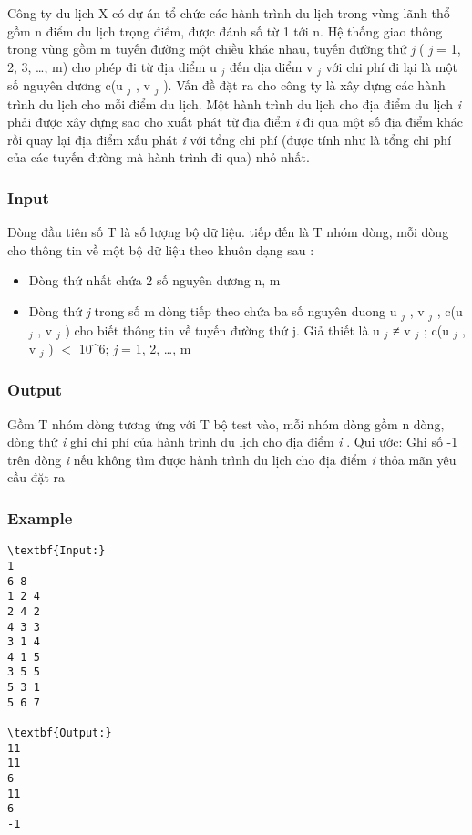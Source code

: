 

Công ty du lịch X có dự án tổ chức các hành trình du lịch trong vùng lãnh thổ gồm n điểm du lịch trọng điểm, được đánh số từ 1 tới n. Hệ thống giao thông trong vùng gồm m tuyến đường một chiều khác nhau, tuyến đường thứ \emph{ j } ( \emph{ j } = 1, 2, 3, …, m) cho phép đi từ địa diểm u $_ j $ đến dịa diểm v $_ j $ với chi phí đi lại là một số nguyên dương c(u $_ j $ , v $_ j $ ). Vấn đề đặt ra cho công ty là xây dựng các hành trình du lịch cho mỗi điểm du lịch. Một hành trình du lịch cho địa điểm du lịch \emph{ i } phải được xây dựng sao cho xuất phát từ địa điểm \emph{ i } đi qua một số địa điểm khác rồi quay lại địa điểm xấu phát \emph{ i } với tổng chi phí (được tính như là tổng chi phí của các tuyến đường mà hành trình đi qua) nhỏ nhất.

\subsubsection{Input}

Dòng đầu tiên số T là số lượng bộ dữ liệu. tiếp đến là T nhóm dòng, mỗi dòng cho thông tin về một bộ dữ liệu theo khuôn dạng sau :
\begin{itemize}
	\item Dòng thứ nhất chứa 2 số nguyên dương n, m
	\item Dòng thứ \emph{ j } trong số m dòng tiếp theo chứa ba số nguyên duong u $_ j $ , v $_ j $ , c(u $_ j $ , v $_ j $ ) cho biết thông tin về tuyến đường thứ j. Giả thiết là u $_ j $ ≠ v $_ j $ ; c(u $_ j $ , v $_ j $ ) $<$ 10\textasciicircum6; \emph{ j } = 1, 2, …, m
\end{itemize}

\subsubsection{Output}

Gồm T nhóm dòng tương ứng với T bộ test vào, mỗi nhóm dòng gồm n dòng, dòng thứ \emph{ i } ghi chi phí của hành trình du lịch cho địa điểm \emph{ i } . Qui ước: Ghi số -1 trên dòng \emph{ i } nếu không tìm được hành trình du lịch cho địa điểm \emph{ i } thỏa mãn yêu cầu đặt ra

\subsubsection{Example}
\begin{verbatim}
\textbf{Input:}
1
6 8
1 2 4
2 4 2
4 3 3
3 1 4
4 1 5
3 5 5
5 3 1
5 6 7

\textbf{Output:}
11
11
6
11
6
-1\end{verbatim}

